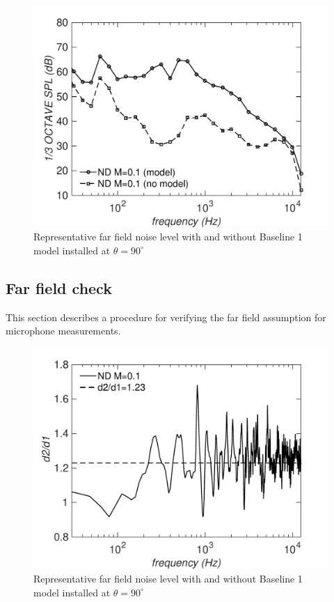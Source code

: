 \begin{figure}
	\begin{center}
		\centerline{\includegraphics[scale=0.7]{figures/mic_empty}}
		\caption{Representative far field noise level with and without Baseline 1 model installed at $\theta = 90^\circ$}
		\label{fig:empty}
	\end{center}
\end{figure}

\subsection{Far field check}
This section describes a procedure for verifying the far field assumption for microphone measurements.

\begin{figure}
	\begin{center}
		\centerline{\includegraphics[scale=0.7]{figures/mic_far}}
		\caption{Representative far field noise level with and without Baseline 1 model installed at $\theta = 90^\circ$}
		\label{fig:far}
	\end{center}
\end{figure}

